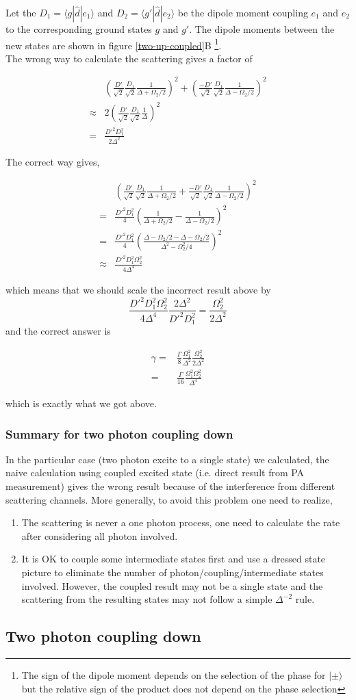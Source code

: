 \documentclass[10pt,fleqn]{article}
\newcommand{\eqar}[1]
{
  \begin{align*}
    #1
  \end{align*}
}
\newcommand{\paren}[1]{{\left({#1}\right)}}
\begin{document}
Let the $D_1=\langle g|\hat d|e_1\rangle$ and $D_2=\langle g'|\hat d|e_2\rangle$ be
the dipole moment coupling $e_1$ and $e_2$ to the corresponding ground states $g$ and $g'$.
The dipole moments between the new states are shown in figure \ref{two-up-coupled}B
\footnote{The sign of the dipole moment depends on the selection of the phase for
  $|\pm\rangle$ but the relative sign of the product does not depend on the phase selection}.\\

The wrong way to calculate the scattering gives a factor of
\eqar{
  &\paren{\frac{D'}{\sqrt2}\frac{D_1}{\sqrt2}\frac{1}{\Delta+\Omega_2/2}}^2+\paren{\frac{-D'}{\sqrt2}\frac{D_1}{\sqrt2}\frac{1}{\Delta-\Omega_2/2}}^2\\
  \approx&2\paren{\frac{D'}{\sqrt2}\frac{D_1}{\sqrt2}\frac{1}{\Delta}}^2\\
  =&\frac{D'^2D_1^2}{2\Delta^2}
}
The correct way gives,
\eqar{
  &\paren{\frac{D'}{\sqrt2}\frac{D_1}{\sqrt2}\frac{1}{\Delta+\Omega_2/2}+\frac{-D'}{\sqrt2}\frac{D_1}{\sqrt2}\frac{1}{\Delta-\Omega_2/2}}^2\\
  =&\frac{D'^2D_1^2}{4}\paren{\frac{1}{\Delta+\Omega_2/2}-\frac{1}{\Delta-\Omega_2/2}}^2\\
  =&\frac{D'^2D_1^2}{4}\paren{\frac{\Delta-\Omega_2/2-\Delta-\Omega_2/2}{\Delta^2-\Omega_2^2/4}}^2\\
  \approx&\frac{D'^2D_1^2\Omega_2^2}{4\Delta^4}
}
which means that we should scale the incorrect result above by
\[\frac{D'^2D_1^2\Omega_2^2}{4\Delta^4}\frac{2\Delta^2}{D'^2D_1^2}=\frac{\Omega_2^2}{2\Delta^2}\]
and the correct answer is
\eqar{
  \gamma=&\frac{\Gamma}{8}\frac{\Omega_1^2}{\Delta^2}\frac{\Omega_2^2}{2\Delta^2}\\
  =&\frac{\Gamma}{16}\frac{\Omega_1^2\Omega_2^2}{\Delta^4}
}
which is exactly what we got above.

\subsubsection{Summary for two photon coupling down}

In the particular case (two photon excite to a single state) we calculated,
the naive calculation using coupled excited state (i.e. direct result from PA measurement)
gives the wrong result because of the interference from different scattering channels.
More generally, to avoid this problem one need to realize,
\begin{enumerate}
\item The scattering is never a one photon process, one need to calculate the rate
  after considering all photon involved.
\item It is OK to couple some intermediate states first and use a dressed state picture
  to eliminate the number of photon/coupling/intermediate states involved. However,
  the coupled result may not be a single state and the scattering from the resulting
  states may not follow a simple $\Delta^{-2}$ rule.
\end{enumerate}

\subsection{Two photon coupling down}

\end{document}

